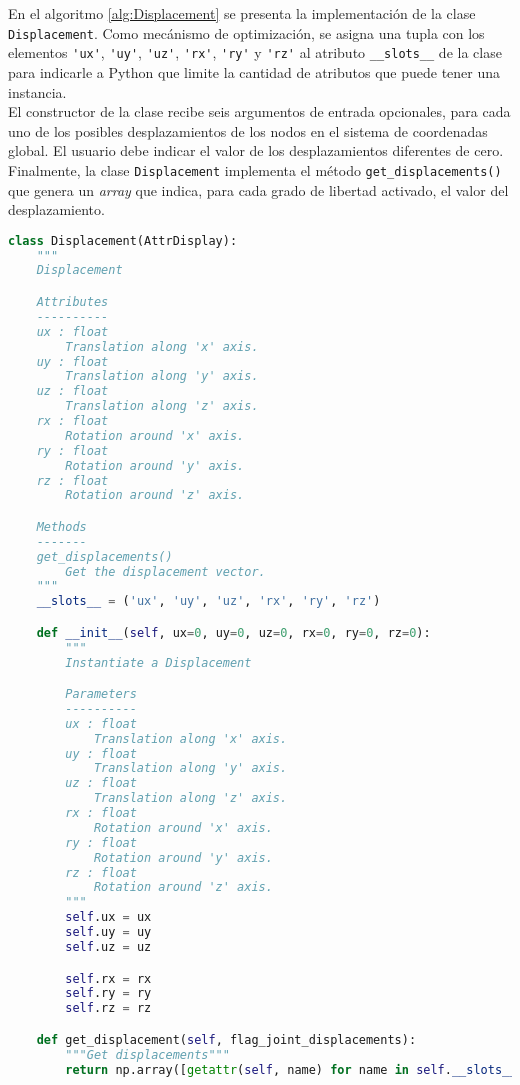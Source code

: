 En el algoritmo \ref{alg:Displacement} se presenta la implementación de la clase \verb|Displacement|. Como mecánismo de optimización, se asigna una tupla con los elementos \verb|'ux'|, \verb|'uy'|, \verb|'uz'|, \verb|'rx'|, \verb|'ry'| y \verb|'rz'| al atributo \verb|__slots__| de la clase para indicarle a Python que limite la cantidad de atributos que puede tener una instancia.\\

El constructor de la clase recibe seis argumentos de entrada opcionales, para cada uno de los posibles desplazamientos de los nodos en el sistema de coordenadas global. El usuario debe indicar el valor de los desplazamientos diferentes de cero.\\

Finalmente, la clase \verb|Displacement| implementa el método \verb|get_displacements()| que genera un \emph{array} que indica, para cada grado de libertad activado, el valor del desplazamiento.\\
\pagebreak

\begin{lstlisting}[language=Python,caption=Clase \texttt{Displacement} implementada en el archivo \texttt{primitives.py}.,label=alg:Displacement, frame=single]
class Displacement(AttrDisplay):
    """
    Displacement

    Attributes
    ----------
    ux : float
        Translation along 'x' axis.
    uy : float
        Translation along 'y' axis.
    uz : float
        Translation along 'z' axis.
    rx : float
        Rotation around 'x' axis.
    ry : float
        Rotation around 'y' axis.
    rz : float
        Rotation around 'z' axis.

    Methods
    -------
    get_displacements()
        Get the displacement vector.
    """
    __slots__ = ('ux', 'uy', 'uz', 'rx', 'ry', 'rz')

    def __init__(self, ux=0, uy=0, uz=0, rx=0, ry=0, rz=0):
        """
        Instantiate a Displacement

        Parameters
        ----------
        ux : float
            Translation along 'x' axis.
        uy : float
            Translation along 'y' axis.
        uz : float
            Translation along 'z' axis.
        rx : float
            Rotation around 'x' axis.
        ry : float
            Rotation around 'y' axis.
        rz : float
            Rotation around 'z' axis.
        """
        self.ux = ux
        self.uy = uy
        self.uz = uz

        self.rx = rx
        self.ry = ry
        self.rz = rz

    def get_displacement(self, flag_joint_displacements):
        """Get displacements"""
        return np.array([getattr(self, name) for name in self.__slots__])[flag_joint_displacements]
\end{lstlisting}

